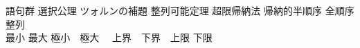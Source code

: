 \documentclass[dvipdfmx,a4paper,11pt]{article}
\theoremstyle{definition}
\begin{document}
 \begin{itembox}[l]{語句群}
選択公理 \quad ツォルンの補題 \quad 整列可能定理 \quad  超限帰納法 \quad 
帰納的\quad 半順序 \quad 全順序 \quad 整列  \\
最小 \quad 最大 \quad 極小　\quad 極大　 \quad 上界　\quad 下界　\quad 上限 \quad 下限
\end{itembox}

\end{document}
